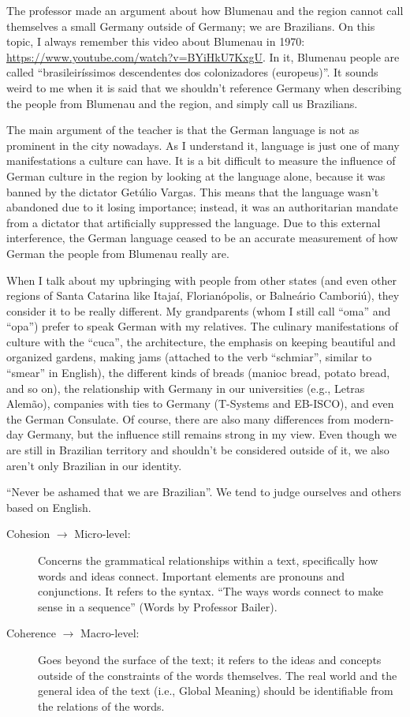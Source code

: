 The professor made an argument about how Blumenau and the region cannot call themselves a small Germany outside of Germany; we are Brazilians. On this topic, I always remember this video about Blumenau in 1970: \url{https://www.youtube.com/watch?v=BYiHkU7KxgU}. In it, Blumenau people are called ``brasileiríssimos descendentes dos colonizadores (europeus)''. It sounds weird to me when it is said that we shouldn't reference Germany when describing the people from Blumenau and the region, and simply call us Brazilians.

The main argument of the teacher is that the German language is not as prominent in the city nowadays. As I understand it, language is just one of many manifestations a culture can have. It is a bit difficult to measure the influence of German culture in the region by looking at the language alone, because it was banned by the dictator Getúlio Vargas. This means that the language wasn't abandoned due to it losing importance; instead, it was an authoritarian mandate from a dictator that artificially suppressed the language. Due to this external interference, the German language ceased to be an accurate measurement of how German the people from Blumenau really are.

When I talk about my upbringing with people from other states (and even other regions of Santa Catarina like Itajaí, Florianópolis, or Balneário Camboriú), they consider it to be really different. My grandparents (whom I still call ``oma'' and ``opa'') prefer to speak German with my relatives. The culinary manifestations of culture with the ``cuca'', the architecture, the emphasis on keeping beautiful and organized gardens, making jams (attached to the verb ``schmiar'', similar to ``smear'' in English), the different kinds of breads (manioc bread, potato bread, and so on), the relationship with Germany in our universities (e.g., Letras Alemão), companies with ties to Germany (T-Systems and EB-ISCO), and even the German Consulate. Of course, there are also many differences from modern-day Germany, but the influence still remains strong in my view. Even though we are still in Brazilian territory and shouldn't be considered outside of it, we also aren't only Brazilian in our identity.

``Never be ashamed that we are Brazilian''. We tend to judge ourselves and others based on English.

\begin{description}
    \item[Cohesion $\rightarrow$ Micro-level:] Concerns the grammatical relationships within a text, specifically how words and ideas connect. Important elements are pronouns and conjunctions. It refers to the syntax. ``The ways words connect to make sense in a sequence'' (Words by Professor Bailer).
    \item[Coherence $\rightarrow$ Macro-level:] Goes beyond the surface of the text; it refers to the ideas and concepts outside of the constraints of the words themselves. The real world and the general idea of the text (i.e., Global Meaning) should be identifiable from the relations of the words.
\end{description}


